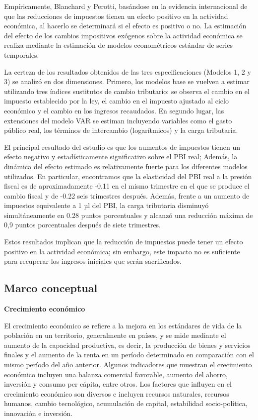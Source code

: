 \documentclass[
  letterpaper,
  DIV=11,
  numbers=noendperiod]{scrartcl}
\begin{document}
Empíricamente, Blanchard y Perotti, basándose en la evidencia
internacional de que las reducciones de impuestos tienen un efecto
positivo en la actividad económica, al hacerlo se determinará si el
efecto es positivo o no. La estimación del efecto de los cambios
impositivos exógenos sobre la actividad económica se realiza mediante la
estimación de modelos econométricos estándar de series temporales.

La certeza de los resultados obtenidos de las tres especificaciones
(Modelos 1, 2 y 3) se analizó en dos dimensiones. Primero, los modelos
base se vuelven a estimar utilizando tres índices sustitutos de cambio
tributario: se observa el cambio en el impuesto establecido por la ley,
el cambio en el impuesto ajustado al ciclo económico y el cambio en los
ingresos recaudados. En segundo lugar, las extensiones del modelo VAR se
estiman incluyendo variables como el gasto público real, los términos de
intercambio (logarítmicos) y la carga tributaria.

El principal resultado del estudio es que los aumentos de impuestos
tienen un efecto negativo y estadísticamente significativo sobre el PBI
real; Además, la dinámica del efecto estimado es relativamente fuerte
para los diferentes modelos utilizados. En particular, encontramos que
la elasticidad del PBI real a la presión fiscal es de aproximadamente
-0.11 en el mismo trimestre en el que se produce el cambio fiscal y de
-0.22 seis trimestres después. Además, frente a un aumento de impuestos
equivalente a 1 µl del PBI, la carga tributaria disminuyó
simultáneamente en 0.28 puntos porcentuales y alcanzó una reducción
máxima de 0,9 puntos porcentuales después de siete trimestres.

Estos resultados implican que la reducción de impuestos puede tener un
efecto positivo en la actividad económica; sin embargo, este impacto no
es suficiente para recuperar los ingresos iniciales que serán
sacrificados.

\hypertarget{sec-marco-conceptual}{%
\subsection{Marco conceptual}\label{sec-marco-conceptual}}

\textbf{Crecimiento económico}

El crecimiento económico se refiere a la mejora en los estándares de
vida de la población en un territorio, generalmente en países, y se mide
mediante el aumento de la capacidad productiva, es decir, la producción
de bienes y servicios finales y el aumento de la renta en un período
determinado en comparación con el mismo período del año anterior.
Algunos indicadores que muestran el crecimiento económico incluyen una
balanza comercial favorable, aumento del ahorro, inversión y consumo per
cápita, entre otros. Los factores que influyen en el crecimiento
económico son diversos e incluyen recursos naturales, recursos humanos,
cambio tecnológico, acumulación de capital, estabilidad socio-política,
innovación e inversión.
\end{document}
